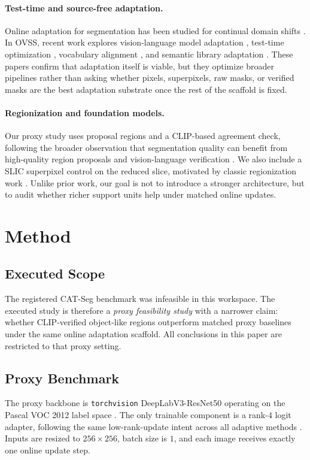 \documentclass{article}
\begin{document}
\paragraph{Test-time and source-free adaptation.}
Online adaptation for segmentation has been studied for continual domain shifts \citep{das2023transadapt,sojka2023continuous,lee2025instanceaware}. In OVSS, recent work explores vision-language model adaptation \citep{noori2025ttavlm}, test-time optimization \citep{desilva2025tto}, vocabulary alignment \citep{mazzucco2025vocalign}, and semantic library adaptation \citep{qorbani2025semla}. These papers confirm that adaptation itself is viable, but they optimize broader pipelines rather than asking whether pixels, superpixels, raw masks, or verified masks are the best adaptation substrate once the rest of the scaffold is fixed.

\paragraph{Regionization and foundation models.}
Our proxy study uses proposal regions and a CLIP-based agreement check, following the broader observation that segmentation quality can benefit from high-quality region proposals and vision-language verification \citep{radford2021clip,kirillov2023sam}. We also include a SLIC superpixel control on the reduced slice, motivated by classic regionization work \citep{achanta2012slic}. Unlike prior work, our goal is not to introduce a stronger architecture, but to audit whether richer support units help under matched online updates.

\section{Method}
\label{sec:method}
\subsection{Executed Scope}
The registered CAT-Seg benchmark was infeasible in this workspace. The executed study is therefore a \emph{proxy feasibility study} with a narrower claim: whether CLIP-verified object-like regions outperform matched proxy baselines under the same online adaptation scaffold. All conclusions in this paper are restricted to that proxy setting.

\subsection{Proxy Benchmark}
The proxy backbone is \texttt{torchvision} DeepLabV3-ResNet50 \citep{chen2017deeplabv3} operating on the Pascal VOC 2012 label space \citep{everingham2015voc}. The only trainable component is a rank-4 logit adapter, following the same low-rank-update intent across all adaptive methods \citep{hu2022lora}. Inputs are resized to $256 \times 256$, batch size is $1$, and each image receives exactly one online update step.
\end{document}
